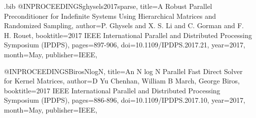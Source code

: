 \documentclass{article}
\begin{document}
\begin{filecontents}{\jobname.bib}
@INPROCEEDINGS{ghysels2017sparse,
  title={A Robust Parallel Preconditioner for Indefinite Systems Using Hierarchical Matrices and Randomized Sampling},
  author={P. Ghysels and X. S. Li and C. Gorman and F. H. Rouet},
  booktitle={2017 IEEE International Parallel and Distributed Processing Symposium (IPDPS)},
  pages={897-906},
  doi={10.1109/IPDPS.2017.21},
  year={2017},
  month={May},
  publisher={IEEE},
}

@INPROCEEDINGS{BirosNlogN,
  title={{An N log N Parallel Fast Direct Solver for Kernel Matrices}},
  author={D Yu Chenhan, William B March, George Biros},
  booktitle={2017 IEEE International Parallel and Distributed Processing Symposium (IPDPS)},
  pages={886-896},
  doi={10.1109/IPDPS.2017.10},
  year={2017},
  month={May},
  publisher={IEEE},
}

\end{filecontents}
\end{document}
